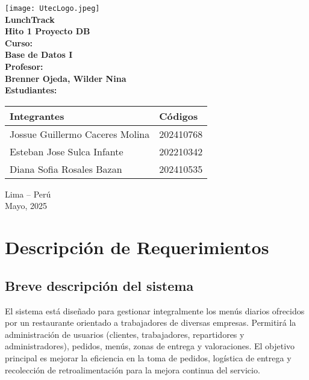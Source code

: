 \documentclass[12pt,a4paper]{article}
\begin{document}
\begin{center}
    \texttt{[image: UtecLogo.jpeg]} \\
    \vspace{1cm}
    \normalsize \textbf{LunchTrack} \\
    \vspace{1cm}
    \textbf{Hito 1 Proyecto DB} \\
    \vspace{0.5cm}
    \textbf{Curso:} \\
    \textbf{Base de Datos I} \\
    \vspace{0.5cm}
    \textbf{Profesor:} \\
    \textbf{Brenner Ojeda, Wilder Nina} \\
    \vspace{0.5cm}
    \textbf{Estudiantes:}
\end{center}

\vspace{0.5cm}

\begin{table}[h]
    \centering
    \begin{tabular}{|>{\raggedright\arraybackslash}m{6cm}|m{3cm}|}
    \hline
    \textbf{Integrantes} & \textbf{Códigos} \\ \hline
    Jossue Guillermo Caceres Molina & 202410768 \\ \hline
    Esteban Jose Sulca Infante & 202210342 \\ \hline
    Diana Sofia Rosales Bazan & 202410535 \\ \hline   
    \end{tabular}
\end{table}

\vfill
\begin{center}
    Lima -- Perú \\
    Mayo, 2025
\end{center}

\newpage

\tableofcontents
\newpage

\section{Descripción de Requerimientos}

\subsection{Breve descripción del sistema}
El sistema está diseñado para gestionar integralmente los menús diarios ofrecidos por un restaurante orientado a trabajadores de diversas empresas. Permitirá la administración de usuarios (clientes, trabajadores, repartidores y administradores), pedidos, menús, zonas de entrega y valoraciones. El objetivo principal es mejorar la eficiencia en la toma de pedidos, logística de entrega y recolección de retroalimentación para la mejora continua del servicio.
\end{document}
